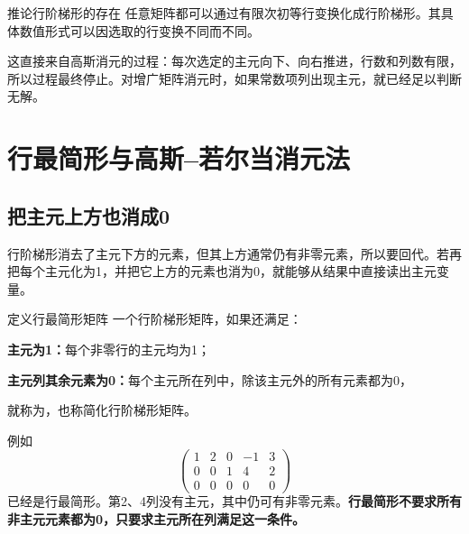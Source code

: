 \documentclass[a4paper,12pt,twoside,openany,fontset=none]{ctexbook}
\newenvironment{corollary}[1][]{\begin{thmBox}{推论}{#1}}{\end{thmBox}}
\newcounter{definition}[chapter]
\newenvironment{definition}[1][]{\begin{defBox}{定义}{#1}}{\end{defBox}}
\numberwithin{equation}{chapter}
\begin{document}
\begin{corollary}[行阶梯形的存在]
任意矩阵都可以通过有限次初等行变换化成行阶梯形。其具体数值形式可以因选取的行变换不同而不同。
\end{corollary}

这直接来自高斯消元的过程：每次选定的主元向下、向右推进，行数和列数有限，所以过程最终停止。对增广矩阵消元时，如果常数项列出现主元，就已经足以判断无解。

\section{行最简形与高斯--若尔当消元法}
\label{sec:two-gauss-jordan}

\subsection*{把主元上方也消成0}

行阶梯形消去了主元下方的元素，但其上方通常仍有非零元素，所以要回代。若再把每个主元化为1，并把它上方的元素也消为0，就能够从结果中直接读出主元变量。

\begin{definition}[行最简形矩阵]
一个行阶梯形矩阵，如果还满足：

\textbf{主元为1：}每个非零行的主元均为1；

\textbf{主元列其余元素为0：}每个主元所在列中，除该主元外的所有元素都为0，

就称为\textbf{}，也称简化行阶梯形矩阵。
\end{definition}


例如
\[
 \left(\begin{array}{rrrr|r}
 1&2&0&-1&3\\0&0&1&4&2\\0&0&0&0&0
 \end{array}\right)
\]
已经是行最简形。第2、4列没有主元，其中仍可有非零元素。\textbf{行最简形不要求所有非主元元素都为0，只要求主元所在列满足这一条件。}
\end{document}
